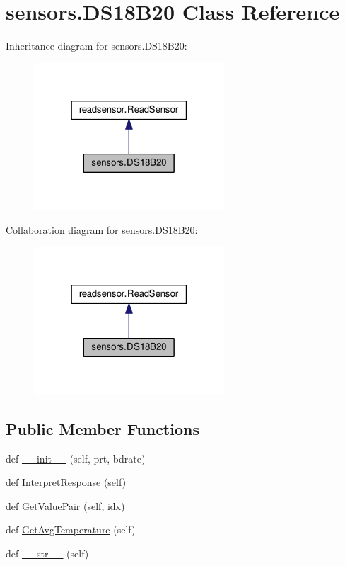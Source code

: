 \hypertarget{classsensors_1_1DS18B20}{}\section{sensors.\+D\+S18\+B20 Class Reference}
\label{classsensors_1_1DS18B20}


Inheritance diagram for sensors.\+D\+S18\+B20\+:\nopagebreak
\begin{figure}[H]
\begin{center}
\leavevmode
\includegraphics[width=202pt]{classsensors_1_1DS18B20__inherit__graph}
\end{center}
\end{figure}


Collaboration diagram for sensors.\+D\+S18\+B20\+:\nopagebreak
\begin{figure}[H]
\begin{center}
\leavevmode
\includegraphics[width=202pt]{classsensors_1_1DS18B20__coll__graph}
\end{center}
\end{figure}
\subsection*{Public Member Functions}
\begin{DoxyCompactItemize}
\item 
def \hyperlink{classsensors_1_1DS18B20_a1029c5b384593c8b9d9826c4f8ba95dc}{\+\_\+\+\_\+init\+\_\+\+\_\+} (self, prt, bdrate)
\item 
def \hyperlink{classsensors_1_1DS18B20_a95d8a3d2b0e0e4ce4090a9d6778e189e}{Interpret\+Response} (self)
\item 
def \hyperlink{classsensors_1_1DS18B20_a00cce06ee0b0b920cb3df86cc5ad1902}{Get\+Value\+Pair} (self, idx)
\item 
def \hyperlink{classsensors_1_1DS18B20_abaf2d655c254d5595879e91860b545f8}{Get\+Avg\+Temperature} (self)
\item 
def \hyperlink{classsensors_1_1DS18B20_a88d7d94ab43332ceea56fa301de9c1d1}{\+\_\+\+\_\+str\+\_\+\+\_\+} (self)
\end{DoxyCompactItemize}
